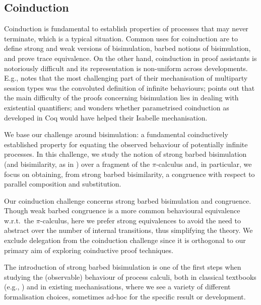 \documentclass[runningheads]{llncs}
\begin{document}
\subsection{Coinduction}
Coinduction is fundamental to establish properties of processes that
may never terminate, which is a typical situation.
Common uses for coinduction are to define strong and weak versions of
bisimulation, barbed notions of bisimulation, and prove trace equivalence.
On the other hand, coinduction in proof assistants
is notoriously difficult and its representation
is non-uniform across developments.
E.g., \cite{Castro-Perez2021} notes that the most challenging
part of their mechanisation of multiparty session types
was the convoluted definition of infinite behaviours;
\cite{Pohjola2022} points out that the main difficulty
of the proofs concerning bisimulation lies
in dealing with existential quantifiers; and
\cite{Bengtson2016} wonders whether parametrised
coinduction as developed in Coq \cite{Hur2013} would
have helped their Isabelle mechanisation.


We base our challenge around bisimulation: a fundamental coinductively
established property for equating the
observed behaviour of potentially infinite processes. 
In this challenge, we study the notion of strong barbed bisimulation
(and bisimilarity, as in \cite{picalcbook})
over a fragment of the $\pi$-calculus and,
in particular, we focus on obtaining,
from strong barbed bisimilarity,
a congruence with respect to
parallel composition and substitution.


Our coinduction challenge concerns strong barbed bisimulation and
congruence.%
Though weak barbed congruence is a more common behavioural equivalence
w.r.t.\ the \(\pi\)-calculus, here we prefer strong equivalences to avoid the
need to abstract over the number of internal transitions, thus
simplifying the theory.  We exclude delegation from the coinduction
challenge since it is orthogonal to our primary aim of exploring
coinductive proof techniques.

The introduction of strong barbed bisimulation is one of the first
steps when studying the (observable) behaviour of process calculi,
both in classical textbooks (e.g., \cite{picalcbook}) and in existing
mechanisations, where we see a variety of different formalisation
choices, sometimes ad-hoc for the specific result or development.
\end{document}
